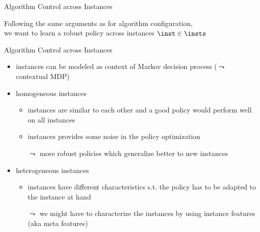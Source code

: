 \begin{frame}[c]{Algorithm Control across Instances }



\bigskip

Following the same arguments as for algorithm configuration,\\
we want to learn a \alert{robust policy across instances $\inst \in \insts$}

\end{frame}
\begin{frame}[c]{Algorithm Control across Instances }

\begin{itemize}
	\item instances can be modeled as context of Markov decision process ($\leadsto$ contextual MDP)
	\medskip
	\pause
	\item \alert{homogeneous} instances
	\begin{itemize}
		\item instances are similar to each other and a good policy would perform well on all instances
		\item instances provides some noise in the policy optimization  
		\item[$\leadsto$] more robust policies which generalize better to new instances
	\end{itemize}
	\medskip
	\pause
	\item \alert{heterogeneous} instances
	\begin{itemize}
		\item instances have different characteristics s.t. the policy has to be adapted to the instance at hand
		\item[$\leadsto$] we might have to characterize the instances by using instance features (aka meta features)
	\end{itemize}
\end{itemize}

\end{frame}
